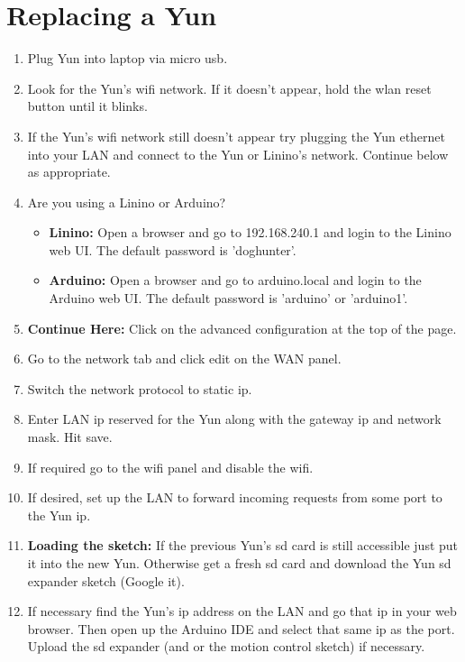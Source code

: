 \documentclass[11pt]{article}
\begin{document}
\section{Replacing a Yun}
\begin{enumerate}
\item Plug Yun into laptop via micro usb.
\item Look for the Yun's wifi network. If it doesn't appear, hold the wlan reset button until it blinks.
\item If the Yun's wifi network still doesn't appear try plugging the Yun ethernet into your LAN and connect to the Yun or Linino's network. Continue below as appropriate.\\
\item Are you using a Linino or Arduino?
        	\begin{itemize} 
		\item {\textbf{Linino:}} Open a browser and go to 192.168.240.1 and login to the Linino web UI. The default password is 'doghunter'.
		\item {\textbf{Arduino:}} Open a browser and go to arduino.local and login to the Arduino web UI. The default password is 'arduino' or 'arduino1'.
	\end{itemize}
\item \textbf{Continue Here:} Click on the advanced configuration at the top of the page.
\item Go to the network tab and click edit on the WAN panel.
\item Switch the network protocol to static ip.
\item Enter LAN ip reserved for the Yun along with the gateway ip and network mask. Hit save.
\item If required go to the wifi panel and disable the wifi.

\item If desired, set up the LAN to forward incoming requests from some port to the Yun ip.\\
\item \textbf{Loading the sketch:} If the previous Yun's sd card is still accessible just put it into the new Yun. Otherwise get a fresh sd card and download the Yun sd expander sketch (Google it).
\item If necessary find the Yun's ip address on the LAN and go that ip in your web browser. Then open up the Arduino IDE and select that same ip as the port. Upload the sd expander (and or the motion control sketch) if necessary.


\end{enumerate}
\end{document}
